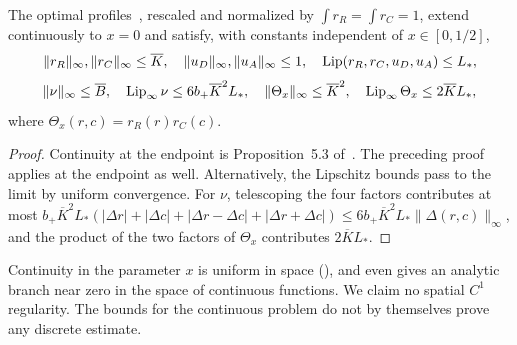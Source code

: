 \begin{teorema}\label{thm:lipschitz}
The optimal
profiles~\cite[Theorem~3.1]{Perfil}, rescaled and normalized by $\int r_R=\int r_C=1$, extend continuously
to $x=0$ and satisfy, with
constants independent of $x\in[0,1/2]$, \[
 \|r_R\|_\infty,\|r_C\|_\infty\le\overline K,\quad \|u_D\|_\infty,\|u_A\|_\infty\le1,\quad
 \operatorname{Lip}(r_R,r_C,u_D,u_A)\le L_*,
\] \[
 \|\nu\|_\infty\le\overline B,\quad \operatorname{Lip}_\infty\nu\le6b_+\overline K^2L_*,\quad
 \|\Theta_x\|_\infty\le\overline K^2,\quad \operatorname{Lip}_\infty\Theta_x\le2\overline KL_*,
\] where $\Theta_x(r,c)=r_R(r)r_C(c)$. \end{teorema}

\begin{proof} Continuity at the endpoint is Proposition~5.3 of~\cite{Perfil}. The preceding proof applies at
the endpoint as well.
Alternatively, the Lipschitz bounds pass to the limit by uniform convergence. For $\nu$, telescoping the
four factors contributes at
most $b_+\overline K^2L_*(|\Delta r|+|\Delta c|+|\Delta r-\Delta c|+|\Delta r+\Delta c|)
\le6b_+\overline
K^2L_*\|\Delta(r,c)\|_\infty$, and the product of the two factors of $\Theta_x$ contributes $2\overline
KL_*$. \end{proof}

Continuity in the parameter $x$ is uniform in space (\cite[Propositions~5.3 and~7.5]{Perfil}), and
\cite[Theorem~5.4]{Perfil} even
gives an analytic branch near zero in the space of continuous functions. We claim no spatial $C^1$
regularity. The bounds for the
continuous problem do not by themselves prove any discrete estimate.
